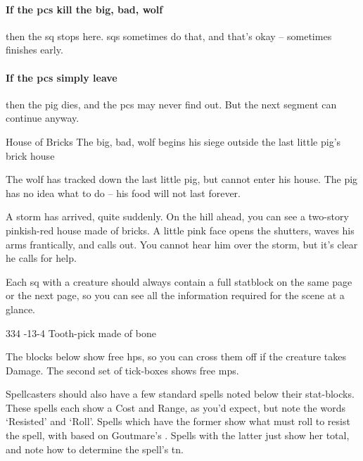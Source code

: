 \begin{multicols}{2}
\paragraph{If the \glspl{pc} kill the big, bad, wolf}
then the \gls{sq} stops here.
\Glspl{sq} sometimes do that, and that's okay -- sometimes  finishes early.

\paragraph{If the \glspl{pc} simply leave}
then the pig dies, and the \glspl{pc} may never find out.
But the next \gls{segment} can continue anyway.

{House of Bricks}%
{The big, bad, wolf begins his siege outside the last little pig's brick house}%

\begin{exampletext}
  The wolf has tracked down the last little pig, but cannot enter his house.
  The pig has no idea what to do -- his food will not last forever.
\end{exampletext}

\begin{boxtext}
  A storm has arrived, quite suddenly.
  On the hill ahead, you can see a two-story pinkish-red house made of bricks.
  A little pink face opens the shutters, waves his arms frantically, and calls out.
  You cannot hear him over the storm, but it's clear he calls for help.
\end{boxtext}

Each \gls{sq} with a creature should always contain a full statblock on the same page or the next page, so you can see all the information required for the scene at a glance.

%
  {{3}{3}{4}}%
  {{-1}{3}{-4}}%
  {%
  }%
  {}%
  {Tooth-pick made of bone}%
  {\quadraped}%

\vspace{2em}

The blocks below show free \glspl{hp}, so you can cross them off if the creature takes Damage.
The second set of tick-boxes shows free \glspl{mp}.

Spellcasters should also have a few standard spells noted below their stat-blocks.
These spells each show a Cost and Range, as you'd expect, but note the words `Resisted' and `Roll'.
Spells which have the former show what  must roll to resist the spell, with  based on Goutmare's .
Spells with the latter just show her  total, and note how to determine the spell's \gls{tn}.


\end{multicols}
